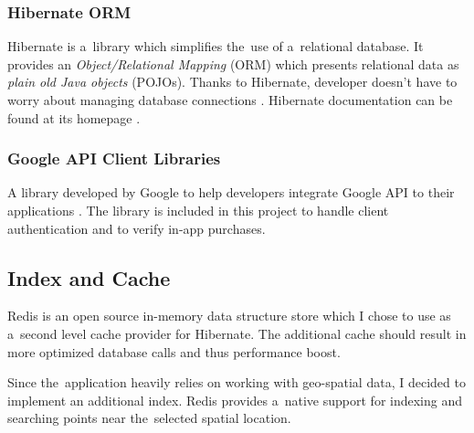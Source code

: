 		\subsubsection*{Hibernate ORM}
		Hibernate is a~library which simplifies the~use of a~relational database. It provides an \textit{Object/Relational Mapping} (ORM) which presents relational data as \textit{plain old Java objects} (POJOs). Thanks to Hibernate, developer doesn't have to worry about managing database connections \cite{hibernatebook}. Hibernate documentation can be found at its homepage \cite{hibernate}.
		
		\subsubsection*{Google API Client Libraries}
		A library developed by Google to help developers integrate Google API to their applications \cite{googleapilibs}. The library is included in this project to handle client authentication and to verify in-app purchases.
		
	\subsection{Index and Cache}
	Redis is an open source in-memory data structure store \cite{redis} which I chose to use as a~second level cache provider for Hibernate. The additional cache should result in more optimized database calls and thus performance boost.
	
	Since the~application heavily relies on working with geo-spatial data, I decided to implement an additional index. Redis provides a~native support for indexing and  searching points near the~selected spatial location.		